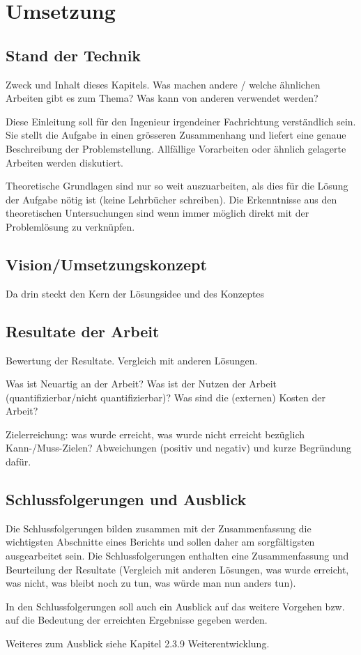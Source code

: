 \chapter{Umsetzung}
\label{umsetzung}

\section{Stand der Technik}
Zweck und Inhalt dieses Kapitels.
Was machen andere / welche ähnlichen Arbeiten gibt es zum Thema? Was kann von anderen verwendet werden?

Diese Einleitung soll für den Ingenieur irgendeiner Fachrichtung verständlich sein. Sie stellt die Aufgabe in einen grösseren Zusammenhang und liefert eine genaue Beschreibung der Problemstellung. Allfällige Vorarbeiten oder ähnlich gelagerte Arbeiten werden diskutiert.
 
Theoretische Grundlagen sind nur so weit auszuarbeiten, als dies für die Lösung der Aufgabe nötig ist (keine Lehrbücher schreiben). Die Erkenntnisse aus den theoretischen Untersuchungen sind wenn immer möglich direkt mit der Problemlösung zu verknüpfen.

\section{Vision/Umsetzungskonzept}
Da drin steckt den Kern der Lösungsidee und des Konzeptes

\section{Resultate der Arbeit}
Bewertung der Resultate. Vergleich mit anderen Lösungen. 

Was ist Neuartig an der Arbeit? Was ist der Nutzen der Arbeit (quantifizierbar/nicht quantifizierbar)? Was sind die (externen) Kosten der Arbeit?

Zielerreichung: was wurde erreicht, was wurde nicht erreicht bezüglich Kann-/Muss-Zielen? Abweichungen (positiv und negativ) und kurze Begründung dafür.

\section{Schlussfolgerungen und Ausblick}
Die Schlussfolgerungen bilden zusammen mit der Zusammenfassung die wichtigsten Abschnitte eines Berichts und sollen daher am sorgfältigsten ausgearbeitet sein. Die Schlussfolgerungen enthalten eine Zusammenfassung und Beurteilung der Resultate (Vergleich mit anderen Lösungen, was wurde erreicht, was nicht, was bleibt noch zu tun, was würde man nun anders tun). 

In den Schlussfolgerungen soll auch ein Ausblick auf das weitere Vorgehen bzw. auf die Bedeutung der erreichten Ergebnisse gegeben werden. 

Weiteres zum Ausblick siehe Kapitel 2.3.9 Weiterentwicklung.